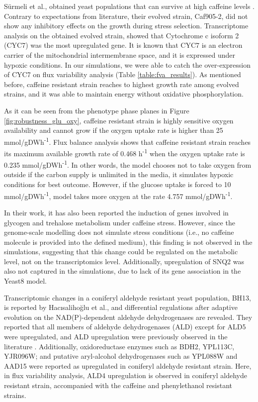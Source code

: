 Sürmeli et al., obtained yeast populations that can survive at high caffeine levels \cite{Srmeli2019}. Contrary to expectations from literature, their evolved strain, Caf905-2, did not show any inhibitory effects on the growth during stress selection. Transcriptome analysis on the obtained evolved strain, showed that Cytochrome c isoform 2 (CYC7) was the most upregulated gene. It is known that CYC7 is an electron carrier of the mitochondrial intermembrane space, and it is expressed under hypoxic conditions. In our simulations, we were able to catch the over-expression of CYC7 on flux variability analysis (Table \ref{table:fva_results}). As mentioned before, caffeine resistant strain reaches to highest growth rate among evolved strains, and it was able to maintain energy without oxidative phosphorylation.

As it can be seen from the phenotype phase planes in Figure \ref{fig:robustness_glu_oxy}, caffeine resistant strain is highly sensitive oxygen availability and cannot grow if the oxygen uptake rate is higher than 25 mmol/gDWh\textsuperscript{-1}. Flux balance analysis shows that caffeine resistant strain reaches its maximum available growth rate of 0.468 h\textsuperscript{-1} when the oxygen uptake rate is 0.235 mmol/gDWh\textsuperscript{-1}. In other words, the model chooses not to take oxygen from outside if the carbon supply is unlimited in the media, it simulates hypoxic conditions for best outcome. However, if the glucose uptake is forced to 10 mmol/gDWh\textsuperscript{-1}, model takes more oxygen at the rate 4.757 mmol/gDWh\textsuperscript{-1}.

In their work, it has also been reported the induction of genes involved in glycogen and trehalose metabolism under caffeine stress. However, since the genome-scale modelling does not simulate stress conditions (i.e., no caffeine molecule is provided into the defined medium), this finding is not observed in the simulations, suggesting that this change could be regulated on the metabolic level, not on the transcriptomics level. Additionally, upregulation of SNQ2 was also not captured in the simulations, due to lack of its gene association in the Yeast8 model.

Transcriptomic changes in a coniferyl aldehyde resistant yeast population, BH13, is reported by Hacısalihoğlu et al., and differential regulations after adaptive evolution on the NAD(P)-dependent aldehyde dehydrogenases are revealed. They reported that all members of aldehyde dehydrogenases (ALD) except for ALD5 were upregulated, and ALD upregulation were previously observed in the literature \cite{adeboye2015catabolism}. Additionally, oxidoreductase enzymes such as BDH2, YPL113C, YJR096W; and putative aryl-alcohol dehydrogenases such as YPL088W and AAD15 were reported as upregulated in coniferyl aldehyde resistant strain. Here, in flux variability analysis, ALD4 upregulation is observed in coniferyl aldehyde resistant strain, accompanied with the caffeine and phenylethanol resistant strains.

